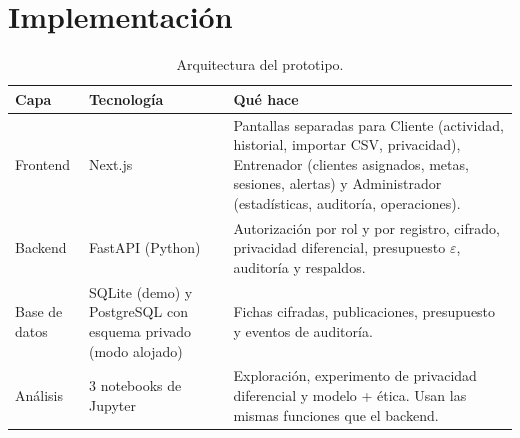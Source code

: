 \documentclass[11pt]{article}
\begin{document}
\section{Implementación}

\begin{table}[H]
\centering\small
\begin{tabularx}{\textwidth}{@{}p{2.4cm}p{3.6cm}Y@{}}
\toprule
\textbf{Capa} & \textbf{Tecnología} & \textbf{Qué hace} \\
\midrule
Frontend & Next.js & Pantallas separadas para Cliente (actividad, historial, importar CSV, privacidad), Entrenador (clientes asignados, metas, sesiones, alertas) y Administrador (estadísticas, auditoría, operaciones). \\
Backend & FastAPI (Python) & Autorización por rol y por registro, cifrado, privacidad diferencial, presupuesto $\varepsilon$, auditoría y respaldos. \\
Base de datos & SQLite (demo) y PostgreSQL con esquema privado (modo alojado) & Fichas cifradas, publicaciones, presupuesto y eventos de auditoría. \\
Análisis & 3 notebooks de Jupyter & Exploración, experimento de privacidad diferencial y modelo + ética. Usan las mismas funciones que el backend. \\
\bottomrule
\end{tabularx}
\caption{Arquitectura del prototipo.}
\end{table}

\begin{center}
\end{center}
\end{document}
